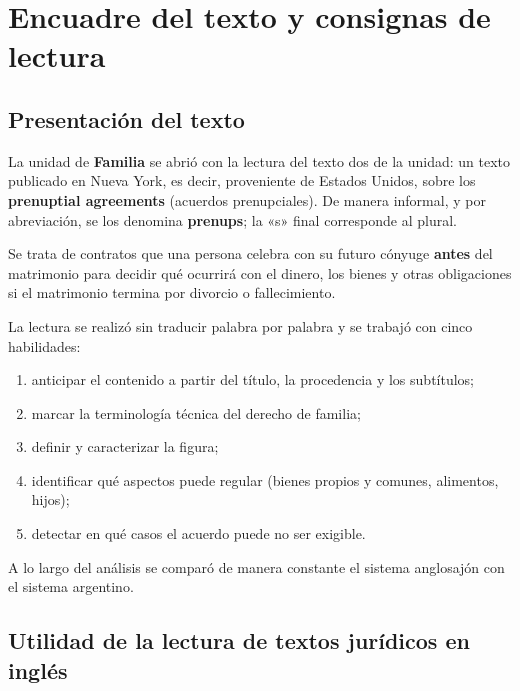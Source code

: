 \documentclass[12pt,oneside]{book}
\begin{document}

\chapter[Encuadre del texto]{Encuadre del texto y consignas de lectura}

\section{Presentación del texto}

La unidad de \textbf{Familia} se abrió con la lectura del texto dos de la unidad: un texto publicado en Nueva York, es decir, proveniente de Estados Unidos, sobre los \textbf{prenuptial agreements} (acuerdos prenupciales). De manera informal, y por abreviación, se los denomina \textbf{prenups}; la «s» final corresponde al plural.

Se trata de contratos que una persona celebra con su futuro cónyuge \textbf{antes} del matrimonio para decidir qué ocurrirá con el dinero, los bienes y otras obligaciones si el matrimonio termina por divorcio o fallecimiento.

La lectura se realizó sin traducir palabra por palabra y se trabajó con cinco habilidades:

\begin{enumerate}
    \item anticipar el contenido a partir del título, la procedencia y los subtítulos;
    \item marcar la terminología técnica del derecho de familia;
    \item definir y caracterizar la figura;
    \item identificar qué aspectos puede regular (bienes propios y comunes, alimentos, hijos);
    \item detectar en qué casos el acuerdo puede no ser exigible.
\end{enumerate}

A lo largo del análisis se comparó de manera constante el sistema anglosajón con el sistema argentino.

\section{Utilidad de la lectura de textos jurídicos en inglés}
\end{document}
